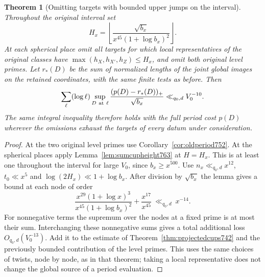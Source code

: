 \documentclass[a4paper,11pt]{article}
\newtheorem{theorem}[proposition]{Theorem}
\theoremstyle{definition}
\theoremstyle{remark}
\numberwithin{equation}{section}
\begin{document}
\begin{theorem}[Omitting targets with bounded upper jumps on the interval]
\leavevmode\label{thm:subcriticalperiod763}
Throughout the original interval set
\[
       H_x=\left\lfloor
            \frac{\sqrt{b_x}}{x^{45}(1+\log b_x)^2}
                         \right\rfloor .
\]
At each spherical place omit all targets for which local
representatives of the original classes have
\(\max(h_X,h_{X'},h_Z)\le H_x\), and omit both original
level primes. Let \(r_*(D)\) be the sum of normalized
lengths of the joint global images on the retained
coordinates, with the same finite tests as before. Then
\[
      \sum_\ell(\log\ell)\sup_{D\ {\rm at}\ \ell}
        \frac{(p(D)-r_*(D))_+}{\sqrt{b_x}}
                            \ll_{q_0,d} V_0^{-10}.
\]
The same integral inequality therefore holds with the full
period cost \(p(D)\) wherever the omissions exhaust the
targets of every datum under consideration.
\end{theorem}
\begin{proof}
At the two original level primes use
Corollary~\ref{cor:oldperiod752}. At the spherical places
apply Lemma~\ref{lem:sumcupheight763} at \(H=H_x\).
This is at least one throughout the interval for large
\(V_0\), since \(b_x\ge x^{500}\). Use
\(n_x\ll_{q_0,d}x^{12}\), \(t_0\ll x^5\) and
\(\log(2H_x)\ll1+\log b_x\). After division by \(\sqrt{b_x}\)
the lemma gives a bound at each node of order
\[
 \frac{x^{29}(1+\log x)^3}{x^{45}(1+\log b_x)^2}
            +\frac{x^{17}}{x^{45}}
       \ \ll_{q_0,d}\ x^{-14}.
\]
For nonnegative terms the supremum over the nodes at a fixed
prime is at most their sum. Interchanging these nonnegative
sums gives a total additional loss \(O_{q_0,d}(V_0^{-13})\).
Add it to the estimate of Theorem~\ref{thm:projectedcups742}
and the previously bounded contribution of the level primes.
This uses the same choices of twists, node by node, as in
that theorem; taking a local representative does not
change the global source of a period evaluation.
\end{proof}
\end{document}
